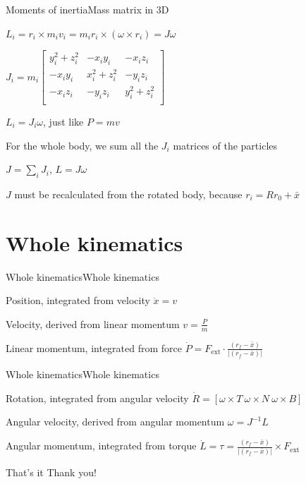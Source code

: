\documentclass{beamer}
\begin{document}
\begin{slide}{Moments of inertia}{Mass matrix in 3D}{
\item $L_i = r_i \times m_i v_i = m_i r_i \times (\omega \times r_i) = J\omega$
\item $J_i = m_i \left[ \begin{matrix}
y_i^2 + z_i^2 & -x_iy_i & -x_iz_i \\
-x_iy_i & x_i^2 + z_i^2 & -y_iz_i \\
-x_iz_i & -y_iz_i & y_i^2 + z_i^2 \\
\end{matrix} \right] $
\item $L_i = J_i\omega$, just like $P = mv$
\item For the whole body, we sum all the $J_i$ matrices of the particles
\item $J = \sum_i J_i$, $L = J \omega$
\item $J$ must be recalculated from the rotated body, because $r_i = R r_0 + \bar x$
}\end{slide}

\section{Whole kinematics}
\begin{slide}{Whole kinematics}{Whole kinematics}{
\item Position, integrated from velocity $\dot x = v$
\item Velocity, derived from linear momentum $v = \frac{P}{m}$
\item Linear momentum, integrated from force $\dot P = F_{\text{ext}} \cdot \frac{(r_f - \bar x)}{|(r_f - \bar x)|}$
}\end{slide}

\begin{slide}{Whole kinematics}{Whole kinematics}{
\item Rotation, integrated from angular velocity $\dot R = [\omega \times T\ \omega \times N\ \omega \times B]$
\item Angular velocity, derived from angular momentum $\omega = J^{-1} L$
\item Angular momentum, integrated from torque $\dot L = \tau = \frac{(r_f - \bar x)}{|(r_f - \bar x)|} \times F_{\text{ext}}$
}\end{slide}

\begin{frame}{That's it}
\center
\fontsize{18pt}{7.2}\selectfont
Thank you!
\end{frame}
\end{document}
